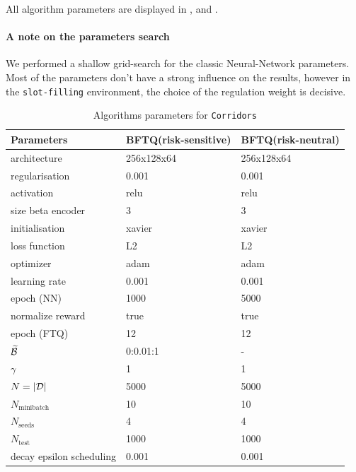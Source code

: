 All algorithm parameters are displayed in , and .

\paragraph{A note on the parameters search}

We performed a shallow grid-search for the classic Neural-Network parameters. Most of the parameters don't have a strong influence on the results, however in the \texttt{slot-filling} environment, the choice of the regulation weight is decisive.

\begin{table}[tp]
    \centering
    \begin{tabularx}{1.0\textwidth}{lll}
        \toprule
        Parameters & BFTQ(risk-sensitive) & BFTQ(risk-neutral)\tabularnewline
        \midrule
        architecture & 256x128x64 & 256x128x64\tabularnewline
        regularisation & 0.001 & 0.001\tabularnewline
        activation & relu & relu\tabularnewline
        size beta encoder & 3 & 3\tabularnewline
        initialisation & xavier & xavier\tabularnewline
        loss function & L2 & L2\tabularnewline
        optimizer & adam & adam\tabularnewline
        learning rate & 0.001 & 0.001\tabularnewline
        epoch (NN) & 1000 & 5000\tabularnewline
        normalize reward & true & true\tabularnewline
        epoch (FTQ) & 12 & 12\tabularnewline
        $\widetilde{\mathcal{B}}$ & 0:0.01:1 & -\tabularnewline
        $\gamma$ & 1 & 1\tabularnewline
        $N=|\mathcal{D}|$ & 5000 & 5000\tabularnewline
        $N_\text{minibatch}$ & 10 & 10\tabularnewline
        $N_\text{seeds}$ & 4 & 4\tabularnewline
        $N_\text{test}$ & 1000 & 1000\tabularnewline
        decay epsilon scheduling & 0.001 & 0.001\tabularnewline
        \bottomrule

    \end{tabularx}
    \caption{Algorithms parameters for \texttt{Corridors}}
    \label{tab:param-algo-corridors}
\end{table}

